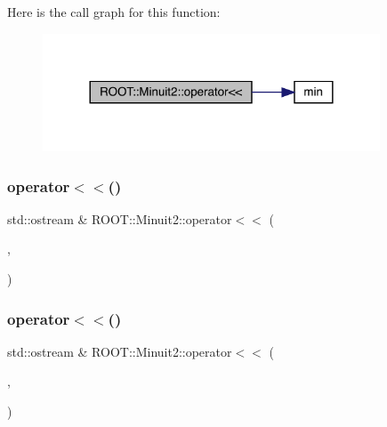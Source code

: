 Here is the call graph for this function\+:\nopagebreak
\begin{figure}[H]
\begin{center}
\leavevmode
\includegraphics[width=284pt]{d6/d3a/namespaceROOT_1_1Minuit2_a172c627b1d5fd6191ca54f94090cd304_cgraph}
\end{center}
\end{figure}
\mbox{\label{namespaceROOT_1_1Minuit2_a687e586a693320c3d638977d002a9e50}} 
\subsubsection{\texorpdfstring{operator$<$$<$()}{operator<<()}\hspace{0.1cm}{\footnotesize\ttfamily [3/11]}}
{\footnotesize\ttfamily std\+::ostream \& R\+O\+O\+T\+::\+Minuit2\+::operator$<$$<$ (\begin{DoxyParamCaption}\item[{std\+::ostream \&}]{,  }\item[{const \mbox{\hyperlink{classROOT_1_1Minuit2_1_1LAVector}{L\+A\+Vector}} \&}]{ }\end{DoxyParamCaption})}

\mbox{\label{namespaceROOT_1_1Minuit2_a37c2d73b40109f988c5ea59e1edf1f8d}} 
\subsubsection{\texorpdfstring{operator$<$$<$()}{operator<<()}\hspace{0.1cm}{\footnotesize\ttfamily [4/11]}}
{\footnotesize\ttfamily std\+::ostream \& R\+O\+O\+T\+::\+Minuit2\+::operator$<$$<$ (\begin{DoxyParamCaption}\item[{std\+::ostream \&}]{,  }\item[{const \mbox{\hyperlink{classROOT_1_1Minuit2_1_1LASymMatrix}{L\+A\+Sym\+Matrix}} \&}]{ }\end{DoxyParamCaption})}

